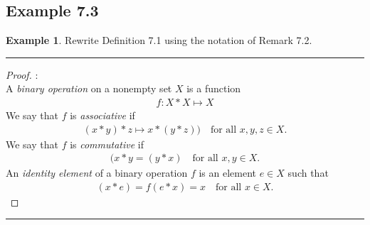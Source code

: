 \documentclass[openany, amssymb, psamsfonts]{amsart}
\theoremstyle{definition}
\newtheorem{exmp}{Example}[section]
\numberwithin{equation}{section}
\begin{document}
\subsection*{Example 7.3}
\begin{exmp}
\label{7.3}
Rewrite Definition 7.1 using the notation of Remark 7.2.
\end{exmp}
\vspace{4pt}     \hrule   \vspace{4pt} \begin{proof} :\\
	A \emph{binary operation} on a nonempty set $X$ is a function 
	\begin{align*}
		f\colon X*X \mapsto X 
	\end{align*}
	We say that $f$ is \emph{associative} if
	\begin{align*}
		(x*y)* z \mapsto x*(y* z))  \quad \text{for all $x, y, z \in X$.}
	\end{align*}
	We say that $f$ is \emph{commutative} if
	\begin{align*}
		(x*y = (y*x) \quad \text{for all $x, y \in X$.}
	\end{align*}
	An \emph{identity element} of a binary operation $f$ is an element $e \in X$ such that
	\begin{align*}
		(x*e) = f(e*x) = x \quad \text{for all $x \in X$.}
	\end{align*}
\end{proof} \vspace{4pt}     \hrule   \vspace{4pt}
\end{document}
